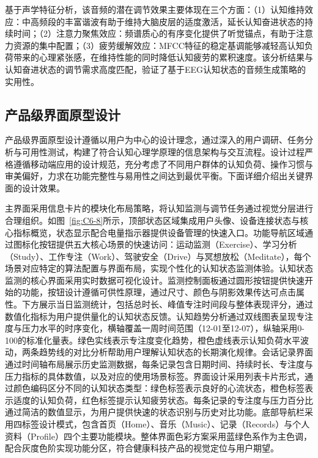 基于声学特征分析，该音频的潜在调节效果主要体现在三个方面：（1）认知维持效应：中高频段的丰富谐波有助于维持大脑皮层的适度激活，延长认知奋进状态的持续时间；（2）注意力聚焦效应：频谱质心的有序变化提供了听觉锚点，有助于注意力资源的集中配置；（3）疲劳缓解效应：MFCC特征的稳定基调能够减轻高认知负荷带来的心理紧张感，在维持性能的同时降低认知疲劳的累积速度。该分析结果与认知奋进状态的调节需求高度匹配，验证了基于EEG认知状态的音频生成策略的实用性。


\subsection{产品级界面原型设计}
产品级界面原型设计遵循以用户为中心的设计理念，通过深入的用户调研、任务分析与可用性测试，构建了符合认知心理学原理的信息架构与交互流程。设计过程严格遵循移动端应用的设计规范，充分考虑了不同用户群体的认知负荷、操作习惯与审美偏好，力求在功能完整性与易用性之间达到最优平衡。下面详细介绍出关键界面的设计效果。

主界面采用信息卡片的模块化布局策略，将认知监测与调节任务通过视觉分层进行合理组织。如图~\ref{fig:C6-8}所示，顶部状态区域集成用户头像、设备连接状态与核心指标概览，状态显示配合电量指示器提供设备管理的快速入口。功能导航区域通过图标化按钮提供五大核心场景的快速访问：运动监测（Exercise）、学习分析（Study）、工作专注（Work）、驾驶安全（Drive）与冥想放松（Meditate），每个场景对应特定的算法配置与界面布局，实现个性化的认知状态监测体验。认知状态监测的核心界面采用实时数据可视化设计。监测控制面板通过圆形按钮提供快速开始的功能，按钮设计遵循可供性原理，通过尺寸、颜色与阴影效果传达可点击属性。下方展示当日监测统计，包括总时长、峰值专注时间段与整体表现评分，通过数值化指标为用户提供量化的认知状态反馈。认知趋势分析通过双线图表呈现专注度与压力水平的时序变化，横轴覆盖一周时间范围（12-01至12-07），纵轴采用0-100的标准化量表。绿色实线表示专注度变化趋势，橙色虚线表示认知负荷水平波动，两条趋势线的对比分析帮助用户理解认知状态的长期演化规律。会话记录界面通过时间轴布局展示历史监测数据，每条记录包含日期时间、持续时长、专注度与压力指标的具体数值，以及对应的使用场景标签。界面设计采用列表卡片形式，通过颜色编码区分不同的认知状态类型：绿色标签表示良好的心流状态，橙色标签表示适度的认知负荷，红色标签提示认知疲劳状态。每条记录的专注度与压力百分比通过简洁的数值显示，为用户提供快速的状态识别与历史对比功能。底部导航栏采用四标签设计模式，包含首页（Home）、音乐（Music）、记录（Records）与个人资料（Profile）四个主要功能模块。整体界面色彩方案采用蓝绿色系作为主色调，配合灰度色阶实现功能分区，符合健康科技产品的视觉定位与用户期望。



